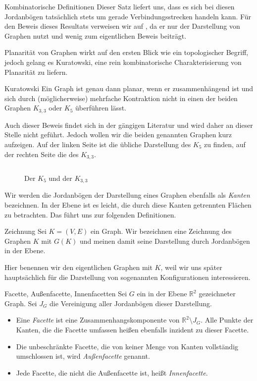 \begin{section}{Kombinatorische Definitionen}
  Dieser Satz liefert uns, dass es sich bei diesen Jordanbögen tatsächlich stets um gerade Verbindungsstrecken handeln kann. Für den Beweis dieses Resultats verweisen wir auf \cite[Seite 113]{fritsch}, da er nur der Darstellung von Graphen nutzt und wenig zum eigentlichen Beweis beiträgt. 
  
  Planarität von Graphen wirkt auf den ersten Blick wie ein topologischer Begriff, jedoch gelang es Kuratowski, eine rein kombinatorische Charakterisierung von Planarität zu liefern.
  
  \begin{satz}{Kuratowski}
   Ein Graph ist genau dann planar, wenn er zusammenhängend ist und sich durch (möglicherweise) mehrfache Kontraktion nicht in einen der beiden Graphen $K_{3,3}$ oder $K_5$ überführen lässt.
  \end{satz}
  
  Auch dieser Beweis findet sich in der gängigen Literatur und wird daher an dieser Stelle nicht geführt. Jedoch wollen wir die beiden genannten Graphen kurz aufzeigen. Auf der linken Seite ist die übliche Darstellung des $K_5$ zu finden, auf der rechten Seite die des $K_{3,3}$.
  
  \begin{figure}[hb]
   \label{kuratowski}
   \[  \]
   \caption[Der $K_5$ und der $K_{3,3}$]{Der $K_5$ und der $K_{3,3}$}
  \end{figure}


  Wir werden die Jordanbögen der Darstellung eines Graphen ebenfalls als \textit{Kanten} bezeichnen. In der Ebene ist es leicht, die durch diese Kanten getrennten Flächen zu betrachten. Das führt uns zur folgenden Definitionen.
  
  \begin{definition}{Zeichnung}
    Sei $K=(V,E)$ ein Graph. Wir bezeichnen eine Zeichnung des Graphen $K$ mit $G(K)$ und meinen damit seine Darstellung durch Jordanbögen in der Ebene.
  \end{definition}
  
  Hier benennen wir den eigentlichen Graphen mit $K$, weil wir uns später hauptsächlich für die Darstellung von sogenannten Konfigurationen interessieren.

  \begin{definition}{Facette, Außenfacette, Innenfacetten}
   Sei $G$ ein in der Ebene $\mathbb{R}^2$ gezeichneter Graph. Sei $J_G$ die Vereinigung aller Jordanbögen dieser Darstellung.
   \begin{itemize}
   \item Eine \textit{Facette} ist eine Zusammenhangskomponente von $\mathbb{R}^2 \setminus J_G$. Alle Punkte der Kanten, die die Facette umfassen heißen ebenfalls inzident zu dieser Facette. 
   \item Die unbeschränkte Facette, die von keiner Menge von Kanten vollständig umschlossen ist, wird \textit{Außenfacette} genannt.
   \item Jede Facette, die nicht die Außenfacette ist, heißt \textit{Innenfacette}.
   \end{itemize}
  \end{definition}
  

\end{section}
